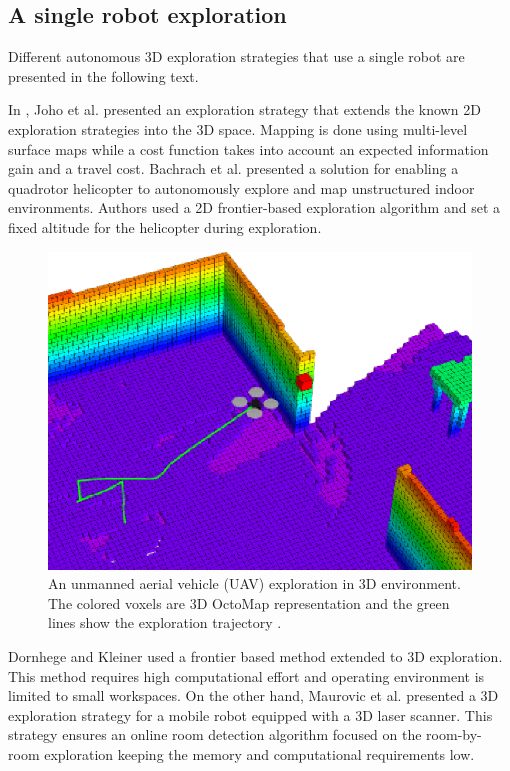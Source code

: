 \subsection{A single robot exploration}  
Different autonomous 3D exploration strategies that use a single robot are presented in the following text.

In \cite{Joho2007}, Joho et al. presented an exploration strategy that extends the known 2D exploration strategies into the 3D space. Mapping is done using multi-level surface maps while a cost function takes
into account an expected information gain and a travel cost. 
Bachrach et
al. \cite{Bachrach2009} presented a solution for enabling a quadrotor helicopter to autonomously explore and map unstructured indoor environments. Authors used a 2D frontier-based exploration algorithm and set a fixed altitude for the helicopter during exploration.  

\begin{figure}[t!]
	\centering
	\includegraphics[width=1.0\columnwidth]{./pictures/octomap_and_drone.png}	
	\caption{An unmanned aerial vehicle (UAV) exploration in 3D environment. The colored voxels are 3D OctoMap representation and the green lines show the exploration trajectory \cite{Wang2019}.}
	\label{fig:octomapanddrone}
\end{figure}

Dornhege and Kleiner \cite{Dornhege2013} used a frontier based method extended to 3D exploration. This method requires high computational effort and operating environment is limited to small workspaces. On the other hand, Maurovic et al. \cite{Maurovic2014} presented a 3D exploration strategy for a mobile robot equipped with a 3D laser scanner. This strategy ensures an online room detection algorithm focused on the room-by-room exploration keeping the memory and computational requirements low.

